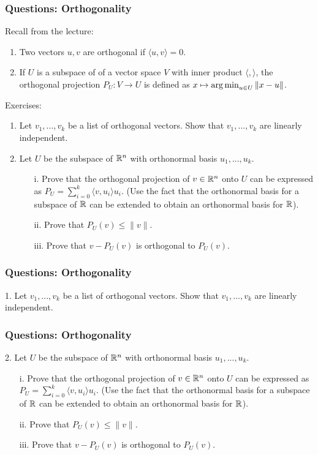 \documentclass{beamer}
\begin{document}
\begin{frame}[t]
\frametitle{Questions: Orthogonality}
Recall from the lecture:
\begin{enumerate}
\item Two vectors $u,v$ are orthogonal if $\langle u, v \rangle = 0$.
\item If $U$ is a subspace of of a vector space $V$ with inner product $\langle , \rangle$, the orthogonal projection $P_{U} : V \rightarrow U$ is defined as $x \mapsto \operatorname*{arg\,min}_{u \in U} \|x-u\|$.
\end{enumerate}
Exercises:
\begin{enumerate}
\item Let $v_1,...,v_k$ be a list of orthogonal vectors. Show that $v_1,...,v_k$ are linearly independent.
\item Let $U$ be the subspace of $\mathbb{R}^n$ with orthonormal basis $u_1,...,u_k$.
\begin{enumerate}
 \item[i.] Prove that the orthogonal projection of $v \in \mathbb{R}^n$ onto $U$ can be expressed as $P_U  = \sum_{i=0}^k  \langle v,u_i \rangle u_i$. (Use the fact that the orthonormal basis for a subspace of $\mathbb{R}$ can be extended to obtain an orthonormal basis for $\mathbb{R}$).
 \item[ii.] Prove that $P_U(v)\leq \|v\|$.
 \item[iii.] Prove that $v-P_U(v)$ is orthogonal to $P_U(v)$.
\end{enumerate}
\end{enumerate}
\end{frame}

\begin{frame}[t]
\frametitle{Questions: Orthogonality}
1. Let $v_1,...,v_k$ be a list of orthogonal vectors. Show that $v_1,...,v_k$ are linearly independent.
\pause
\end{frame}

\begin{frame}[t]
\frametitle{Questions: Orthogonality}
2. Let $U$ be the subspace of $\mathbb{R}^n$ with orthonormal basis $u_1,...,u_k$.
\begin{enumerate}
 \item[i.] Prove that the orthogonal projection of $v \in \mathbb{R}^n$ onto $U$ can be expressed as $P_U  = \sum_{i=0}^k  \langle v,u_i \rangle u_i$. (Use the fact that the orthonormal basis for a subspace of $\mathbb{R}$ can be extended to obtain an orthonormal basis for $\mathbb{R}$).
 \item[ii.] Prove that $P_U(v)\leq \|v\|$.
 \item[iii.] Prove that $v-P_U(v)$ is orthogonal to $P_U(v)$.
 \end{enumerate}
\pause
\pause
\pause
\pause
\end{frame}
\end{document}
